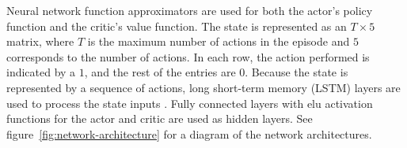 \documentclass{article}
\begin{document}
Neural network function approximators are used for both the actor's policy function and the critic's value function.
The state is represented as an $T \times 5$ matrix, where $T$ is the maximum number of actions in the episode and $5$ corresponds to the number of actions. In each row, the action performed is indicated by a $1$, and the rest of the entries are $0$.
Because the state is represented by a sequence of actions, long short-term memory (LSTM) layers are used to process the state inputs \cite{lstm}. Fully connected layers with elu activation functions for the actor and critic are used as hidden layers. See figure~\ref{fig:network-architecture} for a diagram of the network architectures.
\end{document}
